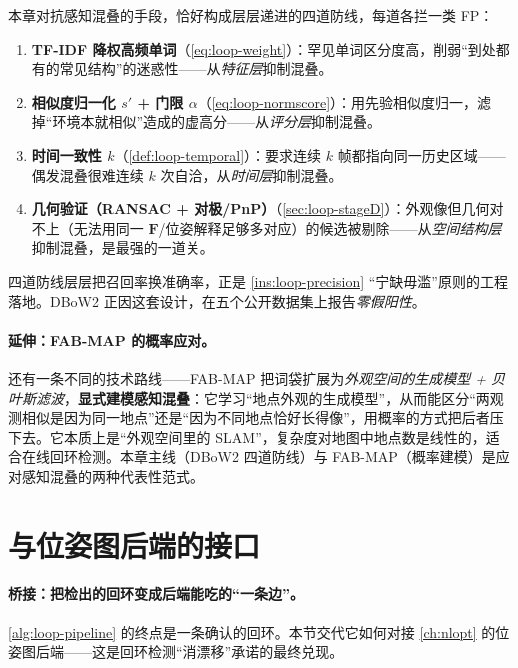 \begin{insight}[防 FP 的四道防线]\label{ins:loop-defense}
本章对抗感知混叠的手段，恰好构成层层递进的四道防线，每道各拦一类 FP：
\begin{enumerate}
  \item \textbf{TF-IDF 降权高频单词}（\cref{eq:loop-weight}）：罕见单词区分度高，削弱“到处都有的常见结构”的迷惑性——从\emph{特征层}抑制混叠。
  \item \textbf{相似度归一化 $s'$ + 门限 $\alpha$}（\cref{eq:loop-normscore}）：用先验相似度归一，滤掉“环境本就相似”造成的虚高分——从\emph{评分层}抑制混叠。
  \item \textbf{时间一致性 $k$}（\cref{def:loop-temporal}）：要求连续 $k$ 帧都指向同一历史区域——偶发混叠很难连续 $k$ 次自洽，从\emph{时间层}抑制混叠。
  \item \textbf{几何验证（RANSAC + 对极/PnP）}（\cref{sec:loop-stageD}）：外观像但几何对不上（无法用同一 $\mathbf F$/位姿解释足够多对应）的候选被剔除——从\emph{空间结构层}抑制混叠，是最强的一道关。
\end{enumerate}
四道防线层层把召回率换准确率，正是 \cref{ins:loop-precision} “宁缺毋滥”原则的工程落地。DBoW2 正因这套设计，在五个公开数据集上报告\emph{零假阳性}\cite{galvez2012bags}。
\end{insight}

\paragraph{延伸：FAB-MAP 的概率应对。}
还有一条不同的技术路线——FAB-MAP\cite{cummins2008fabmap} 把词袋扩展为\emph{外观空间的生成模型 + 贝叶斯滤波}，\textbf{显式建模感知混叠}：它学习“地点外观的生成模型”，从而能区分“两观测相似是因为同一地点”还是“因为不同地点恰好长得像”，用概率的方式把后者压下去。它本质上是“外观空间里的 SLAM”，复杂度对地图中地点数是线性的，适合在线回环检测。本章主线（DBoW2 四道防线）与 FAB-MAP（概率建模）是应对感知混叠的两种代表性范式。

\section{与位姿图后端的接口}
\label{sec:loop-backend}

\paragraph{桥接：把检出的回环变成后端能吃的“一条边”。}
\cref{alg:loop-pipeline} 的终点是一条确认的回环。本节交代它如何对接 \cref{ch:nlopt} 的位姿图后端——这是回环检测“消漂移”承诺的最终兑现。

